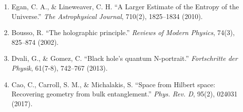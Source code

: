 \documentclass[12pt]{article}
\begin{document}
\begin{enumerate}
    \item Egan, C. A., & Lineweaver, C. H. “A Larger Estimate of the Entropy of the Universe.” \textit{The Astrophysical Journal}, 710(2), 1825–1834 (2010).

    \item Bousso, R. “The holographic principle.” \textit{Reviews of Modern Physics}, 74(3), 825–874 (2002).

    \item Dvali, G., & Gomez, C. “Black hole’s quantum N-portrait.” \textit{Fortschritte der Physik}, 61(7-8), 742–767 (2013).

    \item Cao, C., Carroll, S. M., & Michalakis, S. “Space from Hilbert space: Recovering geometry from bulk entanglement.” \textit{Phys. Rev. D}, 95(2), 024031 (2017).



    
\end{enumerate}
\end{document}
